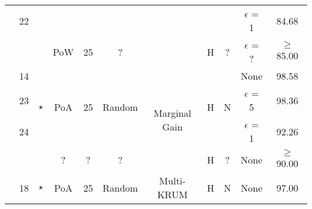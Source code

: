 \begin{landscape}
\begin{table}
\begin{tabular}{c|c|c|c|c|c|c|c|c|c|c}
                                                                                            & 22                  &                                                     &                            &                          &                         &                                &                    &                    & $\epsilon$ = 1                  & 84.68 \\ \cline{2-6}\cline{8-11}
                                                                                            &                     & \cite{10.48550/arxiv.2007.03856}                    & PoW                        & 25                       & ?                       &                                & H                  & ?                  & $\epsilon$ = ?                  & $\geq$ 85.00 \\ \cline{2-11}
                                                                                            & 14                  & \multirow{3}{*}{$\star$}                            & \multirow{3}{*}{PoA}       & \multirow{3}{*}{25}      & \multirow{3}{*}{Random} & \multirow{4}{*}{Marginal Gain} & \multirow{3}{*}{H} & \multirow{3}{*}{N} & None                   & 98.58 \\ \cline{2-2}\cline{10-11}
                                                                                            & 23                  &                                                     &                            &                          &                         &                                &                    &                    & $\epsilon$ = 5                  & 98.36 \\ \cline{2-2}\cline{10-11}
                                                                                            & 24                  &                                                     &                            &                          &                         &                                &                    &                    & $\epsilon$ = 1                  & 92.26 \\ \cline{2-6}\cline{8-11}
                                                                                            &                     & \cite{10.48550/arxiv.2011.07516}                    & ?                          & ?                        & ?                       &                                & H                  & ?                  & None                   & $\geq$ 90.00 \\ \cline{2-11}
                                                                                            & 18                  & \multirow{3}{*}{$\star$}                            & \multirow{3}{*}{PoA}       & \multirow{3}{*}{25}      & \multirow{3}{*}{Random} & \multirow{7}{*}{Multi-KRUM}    & \multirow{3}{*}{H} & \multirow{3}{*}{N} & None                   & 97.00 \\ \cline{2-2}\cline{10-11}

\end{tabular}
\end{table}
\end{landscape}

